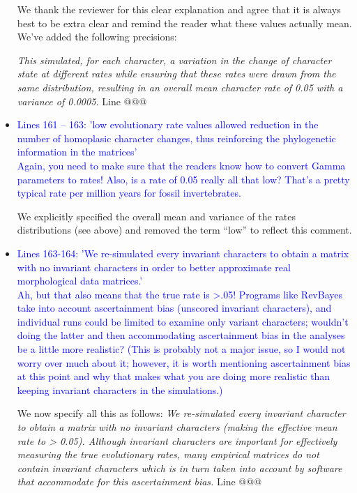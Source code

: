 \documentclass[12pt,letterpaper]{article}
\begin{document}
\begin{itemize}
We thank the reviewer for this clear explanation and agree that it is always best to be extra clear and remind the reader what these values actually mean. We've added the following precisions:

\textit{This simulated, for each character, a variation in the change of character state at different rates while ensuring that these rates were drawn from the same distribution, resulting in an overall mean character rate of 0.05 with a variance of 0.0005.} Line @@@



\item{\textcolor{blue}{Lines 161 – 163: 'low evolutionary rate values allowed reduction in the number of homoplasic character changes, thus reinforcing the phylogenetic information in the matrices'
\\
Again, you need to make sure that the readers know how to convert Gamma parameters to rates! Also, is a rate of 0.05 really all that low? That's a pretty typical rate per million years for fossil invertebrates.}}

We explicitly specified the overall mean and variance of the rates distributions (see above) and removed the term ``low'' to reflect this comment.



\item{\textcolor{blue}{Lines 163-164: 'We re-simulated every invariant characters to obtain a matrix with no invariant characters in order to better approximate real morphological data matrices.'
\\
Ah, but that also means that the true rate is >.05! Programs like RevBayes take into account ascertainment bias (unscored invariant characters), and individual runs could be limited to examine only variant characters; wouldn't doing the latter and then accommodating ascertainment bias in the analyses be a little more realistic? (This is probably not a major issue, so I would not worry over much about it; however, it is worth mentioning ascertainment bias at this point and why that makes what you are doing more realistic than keeping invariant characters in the simulations.)}}

We now specify all this as follows:
\textit{We re-simulated every invariant character to obtain a matrix with no invariant characters (making the effective mean rate to > 0.05). Although invariant characters are important for effectively measuring the true evolutionary rates, many empirical matrices do not contain invariant characters which is in turn taken into account by software that accommodate for this ascertainment bias.} Line @@@




\end{itemize}
\end{document}
